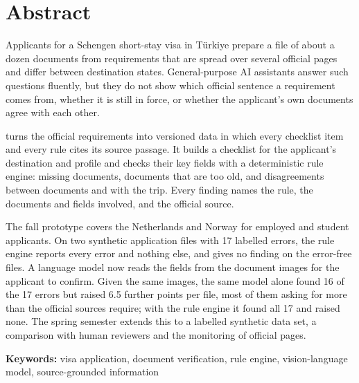 \chapter*{Abstract}
Applicants for a Schengen short-stay visa in Türkiye prepare a file of about a dozen documents
from requirements that are spread over several official pages and differ between destination
states. General-purpose AI assistants answer such questions fluently,
but they do not show which official sentence a requirement comes from, whether it is still in
force, or whether the applicant's own documents agree with each other.

\project{} turns the official requirements into versioned data in which every checklist item and
every rule cites its source passage. It builds a checklist for the applicant's destination and
profile and checks their key fields with a deterministic
rule engine: missing documents, documents that are too old, and disagreements between documents
and with the trip. Every finding names the rule, the documents and fields involved, and the
official source.

The fall prototype covers the Netherlands and Norway for employed and student applicants. On two
synthetic application files with 17 labelled errors, the rule engine reports every error and
nothing else, and gives no finding on the error-free files. A language model now reads the fields
from the document images for the applicant to confirm. Given the same images, the same model
alone found 16 of the 17 errors but raised 6.5 further points per file, most of them asking for
more than the official sources require; with the rule engine it found all 17 and raised none. The
spring semester extends this to a labelled synthetic data set, a comparison with
human reviewers and the monitoring of official pages.

\noindent\textbf{Keywords:} visa application, document verification, rule engine,
vision-language model, source-grounded information
